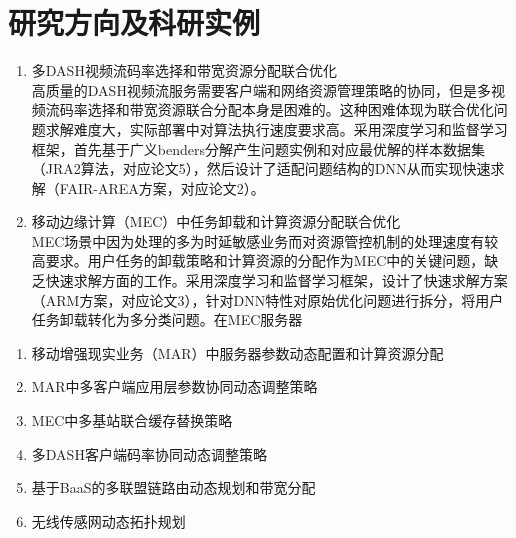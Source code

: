 \documentclass{resume}
\begin{document}
\section{研究方向及科研实例}
\begin{enumerate}
  \item 多DASH视频流码率选择和带宽资源分配联合优化
  \\ 高质量的DASH视频流服务需要客户端和网络资源管理策略的协同，但是多视频流码率选择和带宽资源联合分配本身是困难的。这种困难体现为联合优化问题求解难度大，实际部署中对算法执行速度要求高。采用深度学习和监督学习框架，首先基于广义benders分解产生问题实例和对应最优解的样本数据集（JRA2算法，对应论文5），然后设计了适配问题结构的DNN从而实现快速求解（FAIR-AREA方案，对应论文2）。
  \item 移动边缘计算（MEC）中任务卸载和计算资源分配联合优化
  \\ MEC场景中因为处理的多为时延敏感业务而对资源管控机制的处理速度有较高要求。用户任务的卸载策略和计算资源的分配作为MEC中的关键问题，缺乏快速求解方面的工作。采用深度学习和监督学习框架，设计了快速求解方案（ARM方案，对应论文3），针对DNN特性对原始优化问题进行拆分，将用户任务卸载转化为多分类问题。在MEC服务器
\end{enumerate}
\begin{enumerate}
  \item 移动增强现实业务（MAR）中服务器参数动态配置和计算资源分配
  \item MAR中多客户端应用层参数协同动态调整策略
  \item MEC中多基站联合缓存替换策略
  \item 多DASH客户端码率协同动态调整策略
  \item 基于BaaS的多联盟链路由动态规划和带宽分配
  \item 无线传感网动态拓扑规划
\end{enumerate}
\end{document}
